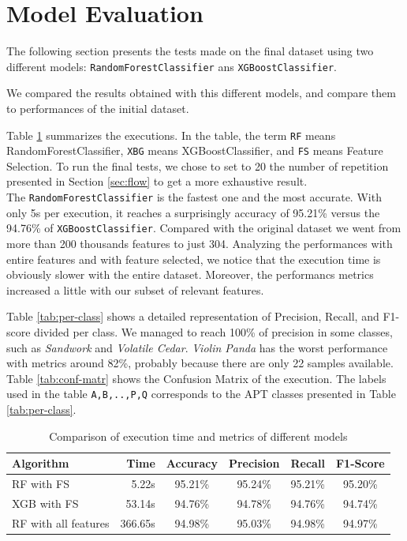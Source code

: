 \section{Model Evaluation}

The following section presents the tests made on the final dataset using two different models: \texttt{RandomForestClassifier} ans \texttt{XGBoostClassifier}.

We compared the results obtained with this different models, and compare them to performances of the initial dataset. 

Table \ref{tab:final} summarizes the executions. In the table, the term \texttt{RF} means RandomForestClassifier, \texttt{XBG} means XGBoostClassifier, and \texttt{FS} means Feature Selection. To run the final tests, we chose to set  to 20 the number of repetition presented in Section \ref{sec:flow} to get a more exhaustive result.\\
The \texttt{RandomForestClassifier} is the fastest one and the most accurate. With only 5s per execution, it reaches a surprisingly accuracy of 95.21\% versus the 94.76\% of \texttt{XGBoostClassifier}. Compared with the original dataset we went from more than 200 thousands features to just 304. Analyzing the performances with entire features and with feature selected, we notice that the execution time is obviously slower with the entire dataset. Moreover, the performancs metrics increased a little with our subset of relevant features.

Table \ref{tab:per-class} shows a detailed representation of Precision, Recall, and F1-score divided per class. We managed to reach 100\% of precision in some classes, such as \textit{Sandwork} and \textit{Volatile Cedar}. \textit{Violin Panda} has the worst performance with metrics around 82\%, probably because there are only 22 samples available. Table
\ref{tab:conf-matr} shows the Confusion Matrix of the execution. The labels used in the table \texttt{A,B,..,P,Q} corresponds to the APT classes presented in Table \ref{tab:per-class}. 
\begin{table}[!h]
	\centering
	\caption{Comparison of execution time and metrics of different models}
	\label{tab:final}
	\begin{tabular}{lrcccc}
		\toprule
		\textbf{Algorithm}                          & \textbf{Time}    & \textbf{Accuracy} & \textbf{Precision} & \textbf{Recall}  & \textbf{F1-Score} \\
		\midrule
		RF with FS & 5.22s   & 95.21\%  & 95.24\%   & 95.21\% & 95.20\%  \\
		XGB with FS      & 53.14s & 94.76\%  & 94.78\%   & 94.76\% & 94.74\%  \\
		RF with all features   &  366.65s  & 94.98\% &       95.03\%    &   94.98\%      & 94.97\%\\
		\bottomrule         
	\end{tabular}
\end{table}


